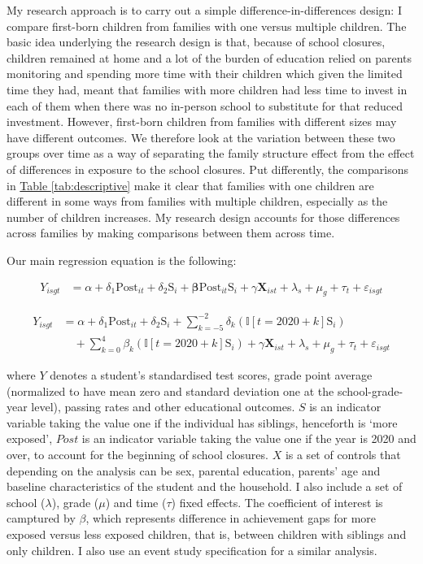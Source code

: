 My research approach is to carry out a simple difference-in-differences design: I compare first-born children from families with one versus multiple children. The basic idea underlying the research design is that, because of school closures, children remained at home and a lot of the burden of education relied on parents monitoring and spending more time with their children which given the limited time they had, meant that families with more children had less time to invest in each of them when there was no in-person school to substitute for that reduced investment. However, first-born children from families with different sizes may have different outcomes. We therefore look at the variation between these two groups over time as a way of separating the family structure effect from the effect of differences in exposure to the school closures. Put differently, the comparisons in \hyperref[tab:descriptive]{Table \ref{tab:descriptive}} make it clear that families with one children are different in some ways from families with multiple children, especially as the number of children increases. My research design accounts for those differences across families by making comparisons between them across time.

Our main regression equation is the following:

    \begin{align}
    Y_{isgt} &= \alpha + \delta_1 \text{Post}_{it} + \delta_2 \text{S}_{i}   + \boldsymbol{\beta} \text{Post}_{it} \text{S}_{i}  + \gamma\mathbf{X}_{ist} + \lambda_s + \mu_g + \tau_t + \varepsilon_{isgt}
    \end{align}

     \begin{align}
    Y_{isgt} &= \alpha + \delta_1 \text{Post}_{it} + \delta_2 \text{S}_{i}   + \sum_{k=-5}^{-2} \delta_k (\mathbb{I}[t = 2020+k] \text{S}_{i}) \nonumber \\
    & \quad + \sum_{k=0}^{4} \beta_k (\mathbb{I}[t = 2020 + k]  \text{S}_{i})  + \gamma\mathbf{X}_{ist} + \lambda_s + \mu_g + \tau_t + \varepsilon_{isgt}
    \end{align}   


where $Y$ denotes a student’s standardised test scores, grade point average (normalized to have mean zero and standard deviation one at the school-grade-year level), passing rates and other educational outcomes. $S$ is an indicator variable taking the value one if the individual has siblings, henceforth is ‘more exposed’, $Post$ is an indicator variable taking the value one if the year is 2020 and over, to account for the beginning of school closures. $X$ is a set of controls that depending on the analysis can be sex, parental education, parents' age and baseline characteristics of the student and the household. I also include a set of school  ($\lambda$), grade  ($\mu$) and time ($\tau$) fixed effects.  The coefficient of interest is camptured by $\beta$, which represents difference in achievement gaps for more exposed versus less exposed children, that is, between children with siblings and only children. I also use an event study specification for a similar analysis.

